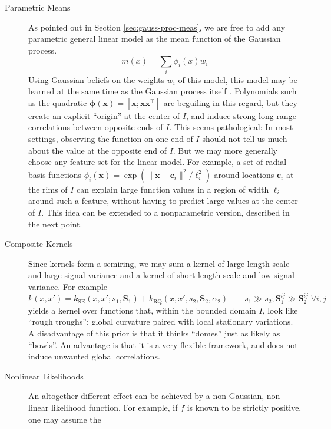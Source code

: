 \documentclass[twoside,11pt]{article}
\newcommand{\Trans}{^{\intercal}}
\newcommand{\vx}{\vec{x}}
\renewcommand{\vec}{\boldsymbol}
\begin{document}
\begin{description}
\item[Parametric Means] As pointed out in Section
  \ref{sec:gauss-proc-meas}, we are free to add any parametric general
  linear model as the mean function of the Gaussian process.
  \begin{equation}
    \label{eq:10}
    m(x) = \sum_i \phi_i(x) w_i
  \end{equation}
  Using Gaussian beliefs on the weights $w_i$ of this model, this
  model may be learned at the same time as the Gaussian process itself
  \citep[][]{RasmussenWilliams}. Polynomials such as
  the quadratic $\vec{\phi}(\vx) = [\vx;\vx\vx\Trans]$ are beguiling
  in this regard, but they create an explicit ``origin'' at the center
  of $I$, and induce strong long-range correlations between opposite
  ends of $I$. This seems pathological: In most settings, observing
  the function on one end of $I$ should not tell us much about the
  value at the opposite end of $I$. But we may more generally choose
  any feature set for the linear model. For example, a set of radial
  basis functions $\phi_i(\vx) = \exp(\|\vx-\vec{c}_i\|^2 / \ell_i
  ^2)$ around locations $\vec{c}_i$ at the rims of $I$ can explain
  large function values in a region of width $\ell_i$ around such a
  feature, without having to predict large values at the center of
  $I$. This idea can be extended to a nonparametric version, described
  in the next point.
\item[Composite Kernels] Since kernels form a semiring, we may sum a
  kernel of large length scale and large signal variance and a kernel
  of short length scale and low signal variance. For example
  \begin{equation}
    \label{eq:11}
    k(x,x') = k_{\text{SE}} (x,x';s_1,\vec{S}_1) +
    k_\text{RQ}(x,x',s_2,\vec{S}_2,\alpha_2) \qquad s_1 \gg s_2;
    \vec{S}_1 ^{ij} \gg \vec{S}_2 ^{ij} \;\forall i,j
  \end{equation}
  yields a kernel over functions that, within the bounded domain $I$,
  look like ``rough troughs'': global curvature paired with local
  stationary variations. A disadvantage of this prior is that it
  thinks ``domes'' just as likely as ``bowls''. An advantage
  is that it is a very flexible framework, and does not induce
  unwanted global correlations.
\item[Nonlinear Likelihoods] An altogether different effect can be
  achieved by a non-Gaussian, non-linear likelihood function. For
  example, if $f$ is known to be strictly positive, one may assume the

\end{description}
\end{document}
